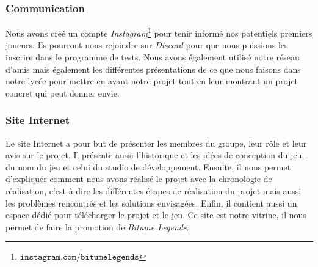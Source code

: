 \documentclass[a4paper,12pt]{article}
\newcommand{\btmlgs}{\textsl{Bitume Legends}}
\begin{document}
        \clearpage
            \subsubsection{Communication}
                Nous avons créé un compte \textsl{Instagram}\footnote{\(\mathtt{instagram.com/bitumelegends}\)}
                pour tenir informé nos potentiels premiers joueurs. 
                Ils pourront nous rejoindre sur \textsl{Discord} pour que nous puissions les inscrire dans le
                programme de tests. Nous avons également utilisé notre réseau d'amis mais également les différentes 
                présentations de ce que nous faisons dans notre lycée pour mettre en avant notre projet tout en leur 
                montrant un projet concret qui peut donner envie.
        
            \subsubsection{Site Internet}
                Le site Internet a pour but de présenter les membres du groupe, leur rôle et leur avis sur le projet.
                Il présente aussi l'historique et les idées de conception du jeu, du nom du jeu et celui du studio
                de développement. Ensuite, il nous permet d'expliquer comment nous avons réalisé le projet avec la
                chronologie de réalisation, c'est-à-dire les différentes étapes de réalisation du projet mais aussi
                les problèmes rencontrés et les solutions envisagées. Enfin, il contient aussi
                un espace dédié pour télécharger le projet et le jeu. Ce site est notre vitrine, il nous permet de 
                faire la promotion de \btmlgs.
        
\end{document}
